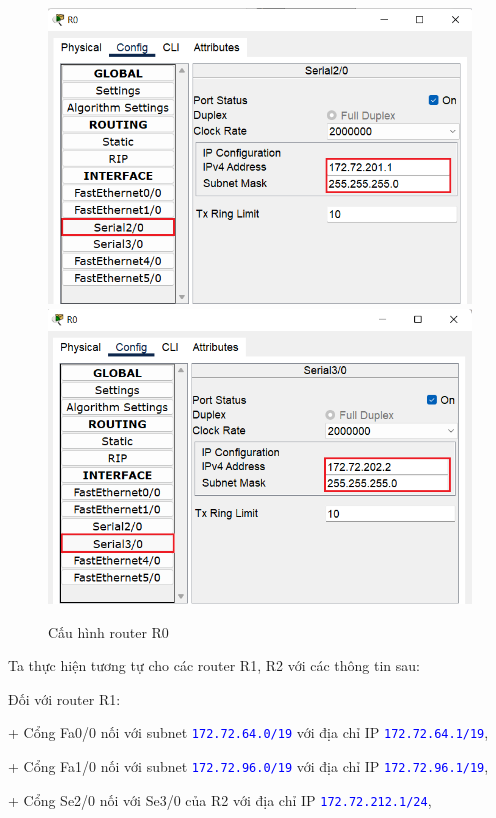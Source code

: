 \begin{enumerate}
\begin{enumerate}
\begin{figure}[H]
\begin{center}
\includegraphics[scale=.6]{../figures/p2/routing3}
\includegraphics[scale=.6]{../figures/p2/routing4}
\end{center}
\caption{Cấu hình router R0}
\end{figure}

Ta thực hiện tương tự cho các router R1, R2 với các thông tin sau:

Đối với router R1: 

+ Cổng Fa0/0 nối với subnet \texttt{\textcolor{blue}{172.72.64.0/19}} với địa chỉ IP \texttt{\textcolor{blue}{172.72.64.1/19}}, 

+ Cổng Fa1/0 nối với subnet \texttt{\textcolor{blue}{172.72.96.0/19}} với địa chỉ IP \texttt{\textcolor{blue}{172.72.96.1/19}}, 

+ Cổng Se2/0 nối với Se3/0 của R2 với địa chỉ IP \texttt{\textcolor{blue}{172.72.212.1/24}}, 


\end{enumerate}
\end{enumerate}
